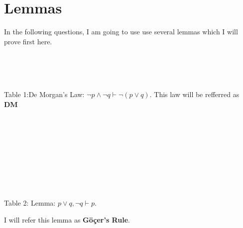 \documentclass[11pt]{article}
\begin{document}
\newpage
\section*{Lemmas}
In the following questions, I am going to use use several lemmas which I will prove first here. \\
\begin{center}
\begin{fitchproof}
 \\
 \\
 \\

\end{fitchproof}
\end{center}
\caption{Table 1:De Morgan's Law: $\neg p \wedge \neg q \vdash \neg (p \vee q).$ This law will be refferred as \textbf{DM}}
\\\\\\\\
\begin{center}
\begin{fitchproof}
 \\
 \\
\\
\end{fitchproof}
\end{center}
\caption{Table 2: Lemma: $p \vee q,\neg q \vdash p.$} I will refer this lemma as \textbf{Göçer's Rule}.
\end{document}
